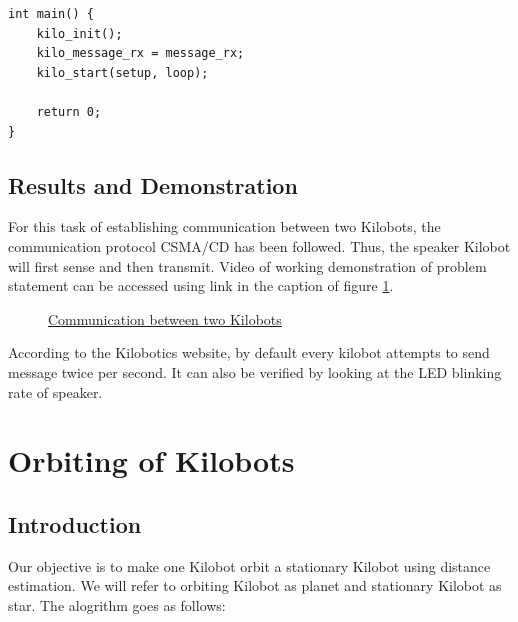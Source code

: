 \begin{verbatim}
int main() {
    kilo_init();
    kilo_message_rx = message_rx;
    kilo_start(setup, loop);

    return 0;
}
\end{verbatim}
\section{Results and Demonstration}
For this task of establishing communication between two Kilobots, the communication protocol CSMA/CD has been followed. Thus, the speaker Kilobot will first sense and then transmit. Video of working demonstration of problem statement can be accessed using link in the caption of figure \ref{fig:communication}.
\begin{figure}[H]
	\centering
	\caption{\href{https://photos.app.goo.gl/h2jCY1WrUYU9xLqG8}{Communication between two Kilobots}}
	\label{fig:communication}
\end{figure}
According to the Kilobotics website, by default every kilobot attempts to send message twice per second. It can also be verified by looking at the LED blinking rate of speaker. 

\chapter{Orbiting of Kilobots}
\section{Introduction}
Our objective is to make one Kilobot orbit a stationary Kilobot using distance estimation. We will refer to orbiting Kilobot as planet and stationary Kilobot as star. The alogrithm goes as follows:

